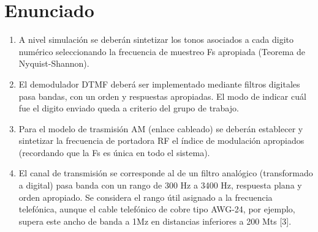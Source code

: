 \section{Enunciado}
\begin{enumerate}[label=\alph*)]
  \item A nivel simulación se deberán sintetizar
        los tonos asociados a cada digito
        numérico seleccionando la frecuencia
        de muestreo Fs apropiada (Teorema de Nyquist-Shannon).
  \item El demodulador DTMF deberá ser
        implementado mediante filtros
        digitales pasa bandas, con un
        orden y respuestas apropiadas. El
        modo de indicar cuál fue el digito
        enviado queda a criterio del grupo
        de trabajo.
  \item Para el modelo de trasmisión AM
        (enlace cableado) se deberán
        establecer y sintetizar la frecuencia
        de portadora RF el índice de
        modulación apropiados
        (recordando que la Fs es única en
        todo el sistema).
  \item El canal de transmisión se
        corresponde al de un filtro
        analógico (transformado a digital)
        pasa banda con un rango de 300 Hz
        a 3400 Hz, respuesta plana y orden
        apropiado. Se considera el rango
        útil asignado a la frecuencia
        telefónica, aunque el cable
        telefónico de cobre tipo AWG-24,
        por ejemplo, supera este ancho de
        banda a 1Mz en distancias
        inferiores a 200 Mts [3].
\end{enumerate}

